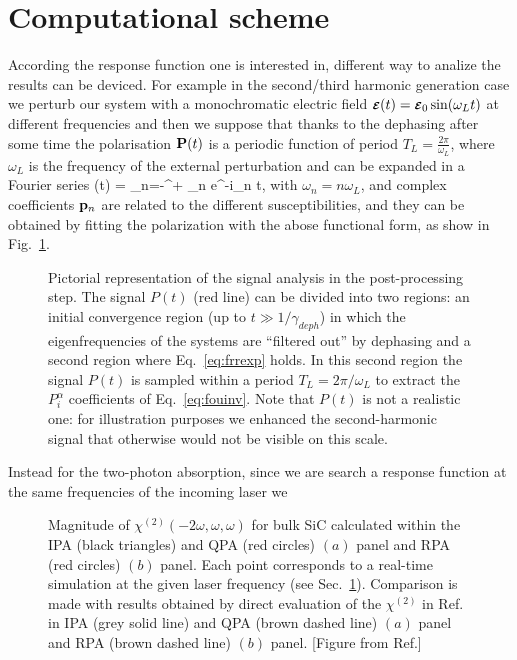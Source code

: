 \section{Computational scheme}\label{sc:compdet}
According the response function one is interested in, different way to analize the results can be deviced. For example in the  second/third harmonic generation case we perturb our system with  a monochromatic electric field $\boldsymbol{\scriptstyle \cal E}(t) = \boldsymbol{\scriptstyle \cal E}_0 \sin(\omega_L t)$ at different frequencies and then we suppose that thanks to the dephasing after some time the  polarisation ${\bf P}(t)$ is a periodic function of period $T_L =\frac{2\pi}{\omega_L}$, where $\omega_L$ is the frequency of the external perturbation and can be expanded in a Fourier series
\be\label{eq:frrexp}
\PP(t) = \sum_{n=-\infty}^{+\infty} \pp_n e^{-i\omega_n t},
\ee  
with $\omega_n = n \omega_L$, and complex coefficients ${\bf p}_n$ are related to the different susceptibilities, and they can be obtained by fitting the polarization with the abose functional form, as show in Fig.~\ref{fg:ptanalysis}. 
\begin{figure}[ht]
\centering
{}
\caption{\footnotesize{Pictorial representation of the signal analysis in the post-processing step. The signal  $P(t)$ (red line) can be divided into two regions: an initial convergence region (up to $t\gg 1/\gamma_{deph}$) in which the eigenfrequencies of the systems are ``filtered out'' by dephasing and a second region where Eq.~\eqref{eq:frrexp} holds. In this second region the signal $P(t)$ is sampled within a period $T_L=2\pi/\omega_L$ to extract the $P^\alpha_i$ coefficients of Eq.~\ref{eq:fouinv}. Note that $P(t)$ is not a realistic one: for illustration purposes we enhanced the second-harmonic signal that otherwise would not be visible on this scale.}} 
\label{fg:ptanalysis}
\end{figure} 
Instead for the two-photon absorption, since we are search a response function at the same frequencies of the incoming laser we
\begin{figure}[ht]
\centering
{}
\caption{\footnotesize{Magnitude of $\chi^{(2)}(-2\omega,\omega,\omega)$ for bulk SiC calculated within the IPA (black triangles) and QPA (red circles) $(a)$ panel and RPA (red circles) $(b)$ panel. Each point corresponds to a real-time simulation at the given laser frequency (see Sec.~\ref{sc:compdet}). Comparison is made with results obtained \ai by direct evaluation of the $\chi^{(2)}$ in Ref.~\cite{PhysRevB.82.235201} in IPA (grey solid line) and QPA (brown dashed line) $(a)$  panel and RPA (brown dashed line) $(b)$ panel.  \label{fg:SiCQPRPA} [Figure from Ref.\cite{nloptics2013}]}}
\end{figure}
